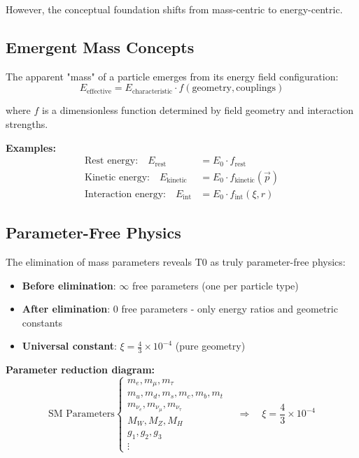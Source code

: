 \documentclass[12pt,a4paper]{report}
\begin{document}
However, the conceptual foundation shifts from mass-centric to energy-centric.

\subsection{Emergent Mass Concepts}
\label{subsec:emergent_mass}

The apparent "mass" of a particle emerges from its energy field configuration:
\begin{equation}
	E_{\text{effective}} = E_{\text{characteristic}} \cdot f(\text{geometry}, \text{couplings})
\end{equation}

where $f$ is a dimensionless function determined by field geometry and interaction strengths.

\textbf{Examples:}
\begin{align}
	\text{Rest energy:} \quad E_{\text{rest}} &= E_0 \cdot f_{\text{rest}} \\
	\text{Kinetic energy:} \quad E_{\text{kinetic}} &= E_0 \cdot f_{\text{kinetic}}(\vec{p}) \\
	\text{Interaction energy:} \quad E_{\text{int}} &= E_0 \cdot f_{\text{int}}(\xi, r)
\end{align}

\subsection{Parameter-Free Physics}
\label{subsec:parameter_free}

The elimination of mass parameters reveals T0 as truly parameter-free physics:
\begin{itemize}
	\item \textbf{Before elimination}: $\infty$ free parameters (one per particle type)
	\item \textbf{After elimination}: 0 free parameters - only energy ratios and geometric constants
	\item \textbf{Universal constant}: $\xi = \frac{4}{3} \times 10^{-4}$ (pure geometry)
\end{itemize}

\textbf{Parameter reduction diagram:}
\begin{equation}
	\text{SM Parameters} \begin{cases}
		m_e, m_\mu, m_\tau \\
		m_u, m_d, m_s, m_c, m_b, m_t \\
		m_{\nu_e}, m_{\nu_\mu}, m_{\nu_\tau} \\
		M_W, M_Z, M_H \\
		g_1, g_2, g_3 \\
		\vdots
	\end{cases} \quad \Rightarrow \quad \xi = \frac{4}{3} \times 10^{-4}
\end{equation}
\end{document}
